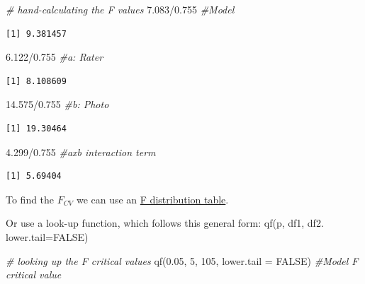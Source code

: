 \documentclass[
  11pt,
]{book}
\newenvironment{Shaded}{\begin{snugshade}}{\end{snugshade}}
\newcommand{\AttributeTok}[1]{\textcolor[rgb]{0.77,0.63,0.00}{#1}}
\newcommand{\CommentTok}[1]{\textcolor[rgb]{0.56,0.35,0.01}{\textit{#1}}}
\newcommand{\ConstantTok}[1]{\textcolor[rgb]{0.00,0.00,0.00}{#1}}
\newcommand{\DecValTok}[1]{\textcolor[rgb]{0.00,0.00,0.81}{#1}}
\newcommand{\FloatTok}[1]{\textcolor[rgb]{0.00,0.00,0.81}{#1}}
\newcommand{\FunctionTok}[1]{\textcolor[rgb]{0.00,0.00,0.00}{#1}}
\newcommand{\NormalTok}[1]{#1}
\newcommand{\SpecialCharTok}[1]{\textcolor[rgb]{0.00,0.00,0.00}{#1}}
\begin{document}
\begin{Shaded}
\begin{Highlighting}[]
\CommentTok{\# hand{-}calculating the F values}
\FloatTok{7.083}\SpecialCharTok{/}\FloatTok{0.755}  \CommentTok{\#Model}
\end{Highlighting}
\end{Shaded}

\begin{verbatim}
[1] 9.381457
\end{verbatim}

\begin{Shaded}
\begin{Highlighting}[]
\FloatTok{6.122}\SpecialCharTok{/}\FloatTok{0.755}  \CommentTok{\#a: Rater}
\end{Highlighting}
\end{Shaded}

\begin{verbatim}
[1] 8.108609
\end{verbatim}

\begin{Shaded}
\begin{Highlighting}[]
\FloatTok{14.575}\SpecialCharTok{/}\FloatTok{0.755}  \CommentTok{\#b:  Photo}
\end{Highlighting}
\end{Shaded}

\begin{verbatim}
[1] 19.30464
\end{verbatim}

\begin{Shaded}
\begin{Highlighting}[]
\FloatTok{4.299}\SpecialCharTok{/}\FloatTok{0.755}  \CommentTok{\#axb interaction term}
\end{Highlighting}
\end{Shaded}

\begin{verbatim}
[1] 5.69404
\end{verbatim}

To find the \(F_{CV}\) we can use an \href{https://www.statology.org/f-distribution-table/}{F distribution table}.

Or use a look-up function, which follows this general form: qf(p, df1, df2. lower.tail=FALSE)

\begin{Shaded}
\begin{Highlighting}[]
\CommentTok{\# looking up the F critical values}
\FunctionTok{qf}\NormalTok{(}\FloatTok{0.05}\NormalTok{, }\DecValTok{5}\NormalTok{, }\DecValTok{105}\NormalTok{, }\AttributeTok{lower.tail =} \ConstantTok{FALSE}\NormalTok{)  }\CommentTok{\#Model F critical value}
\end{Highlighting}
\end{Shaded}
\end{document}
